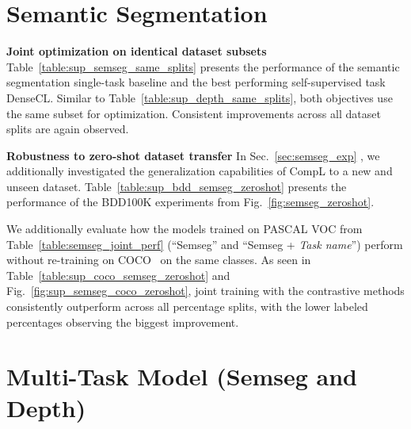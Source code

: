 \documentclass[10pt,twocolumn,letterpaper]{article}
\newcommand{\parsection}[1]{\vspace{1mm}\noindent\textbf{#1 }}
\begin{document}
 \section{Semantic Segmentation}

\parsection{Joint optimization on identical dataset subsets}
Table~\ref{table:sup_semseg_same_splits} presents the performance of the semantic segmentation single-task baseline and the best performing self-supervised task DenseCL. Similar to Table~\ref{table:sup_depth_same_splits},
both objectives use the same subset for optimization. Consistent improvements across all dataset splits are again observed.

\parsection{Robustness to zero-shot dataset transfer}
In 
Sec.~\ref{sec:semseg_exp}
, we additionally investigated the generalization capabilities of CompL to a new and unseen dataset.
Table~\ref{table:sup_bdd_semseg_zeroshot} presents the performance of the BDD100K experiments from 
Fig.~\ref{fig:semseg_zeroshot}.


We additionally evaluate how the models trained on PASCAL VOC from 
Table~\ref{table:semseg_joint_perf}
(``Semseg'' and ``Semseg + \emph{Task name}'') perform without re-training on COCO~\cite{lin2014microsoft} on the same classes. 
As seen in Table~\ref{table:sup_coco_semseg_zeroshot} and Fig.~\ref{fig:sup_semseg_coco_zeroshot}, joint training with the contrastive methods consistently outperform across all percentage splits, with the lower labeled percentages observing the biggest improvement. \section{Multi-Task Model (Semseg and Depth)}

\begin{table}[t]
  \center  
  \caption{Semantic segmentation performance in mIoU on PASCAL VOC.
  Both supervised and self-supervised objectives use identical splits. CompL denotes the addition of the best performing self-supervised objective, DenseCL, and yields consistent improvements.}
  \vspace{-0.1in}
  \label{table:sup_semseg_same_splits}
\end{table}
\end{document}
